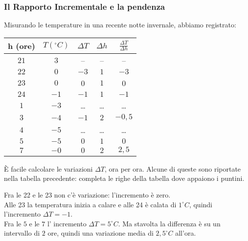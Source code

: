 \subsubsection{Il Rapporto Incrementale e la pendenza}
\label{subsubsec:RI}
\begin{esempio}
Misurando le temperature in una recente notte invernale, abbiamo registrato:

\noindent \begin{minipage}{0.48\textwidth}
 \begin{center}
\begin{tabular}{ccccc}\toprule
h (ore) & \(T (^\circ \! C)\) & \(\Delta T\) & \(\Delta h\)
             & \(\frac{\Delta T}{\Delta h}\)\\\midrule
\(21\) & \(3\) & -- & -- & -- \\
\(22\) & \(0\) & \(-3\) & \(1\) &\(-3\) \\
\(23\) & \(0\) & 0 & \(1\) & 0 \\
\(24\) & \(-1\) & \(-1\) & \(1\) & \(-1\) \\
\(1\) & \(-3\) &\dots &\dots & \dots\\
\(3\)  & \(-4\) & \(-1\) & \(2\) &\(-0,5\)\\
\(4\)  & \(-5\) &\dots &\dots & \dots\\
\(5\)  & \(-5\) & \(0\)  & \(1\) &\(0\)\\
\(7\)  & \(-0\) & \(0\) & \(2\) & \(2,5\)
\\ \bottomrule
\end{tabular}
\label{tab:temperaturea}
\end{center}
\end{minipage}
 \hfill
\begin{minipage}{.48 \textwidth}
\begin{inaccessibleblock}
\begin{center} \scalebox{1}{\temperaturea} \end{center}
\end{inaccessibleblock}
\label{graf:temperaturea}
\end{minipage}

È facile calcolare le variazioni \(\Delta T\), ora per ora. 
Alcune di queste sono riportate nella tabella precedente: 
completa le righe della tabella dove appaiono i puntini.

Fra le 22 e le 23 non c'è variazione: l'incremento è zero. \\
Alle 23 la temperatura inizia a calare e alle 24 è calata di 
\(1^\circ C\), quindi l'incremento \( \Delta T=-1\). \\
Fra le \(5\) e le \(7\) l' incremento \(\Delta T= 5 ^\circ C\). 
Ma stavolta la differenza è su un intervallo di \(2\) ore, 
quindi una variazione media di \(2,5 ^\circ C\) all'ora.


\end{esempio}
